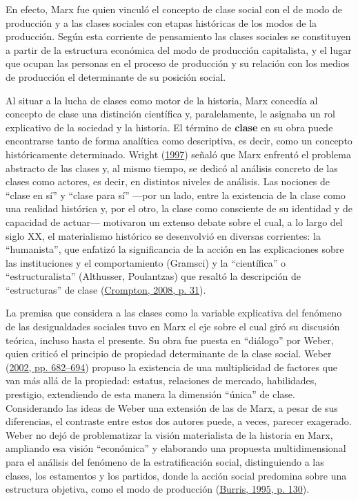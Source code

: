 \documentclass[
]{article}
\begin{document}
En efecto, Marx fue quien vinculó el concepto de clase social con el de modo de producción y a las clases sociales con etapas históricas de los modos de la producción. Según esta corriente de pensamiento las clases sociales se constituyen a partir de la estructura económica del modo de producción capitalista, y el lugar que ocupan las personas en el proceso de producción y su relación con los medios de producción el determinante de su posición social.

Al situar a la lucha de clases como motor de la historia, Marx concedía al concepto de clase una distinción científica y, paralelamente, le asignaba un rol explicativo de la sociedad y la historia. El término de \textbf{clase} en su obra puede encontrarse tanto de forma analítica como descriptiva, es decir, como un concepto históricamente determinado. Wright (\protect\hyperlink{ref-Wright1997}{1997}) señaló que Marx enfrentó el problema abstracto de las clases y, al mismo tiempo, se dedicó al análisis concreto de las clases como actores, es decir, en distintos niveles de análisis. Las nociones de ``clase en sí'' y ``clase para sí'' ---por un lado, entre la existencia de la clase como una realidad histórica y, por el otro, la clase como consciente de su identidad y de capacidad de actuar--- motivaron un extenso debate sobre el cual, a lo largo del siglo XX, el materialismo histórico se desenvolvió en diversas corrientes: la ``humanista'', que enfatizó la significancia de la acción en las explicaciones sobre las instituciones y el comportamiento (Gramsci) y la ``científica'' o ``estructuralista'' (Althusser, Poulantzas) que resaltó la descripción de ``estructuras'' de clase (\protect\hyperlink{ref-Crompton2008}{Crompton, 2008, p. 31}).

La premisa que considera a las clases como la variable explicativa del fenómeno de las desigualdades sociales tuvo en Marx el eje sobre el cual giró su discusión teórica, incluso hasta el presente. Su obra fue puesta en ``diálogo'' por Weber, quien criticó el principio de propiedad determinante de la clase social. Weber (\protect\hyperlink{ref-Weber2002}{2002, pp. 682--694}) propuso la existencia de una multiplicidad de factores que van más allá de la propiedad: estatus, relaciones de mercado, habilidades, prestigio, extendiendo de esta manera la dimensión ``única'' de clase. Considerando las ideas de Weber una extensión de las de Marx, a pesar de sus diferencias, el contraste entre estos dos autores puede, a veces, parecer exagerado. Weber no dejó de problematizar la visión materialista de la historia en Marx, ampliando esa visión ``económica'' y elaborando una propuesta multidimensional para el análisis del fenómeno de la estratificación social, distinguiendo a las clases, los estamentos y los partidos, donde la acción social predomina sobre una estructura objetiva, como el modo de producción (\protect\hyperlink{ref-Burris1995}{Burris, 1995, p. 130}).
\end{document}
